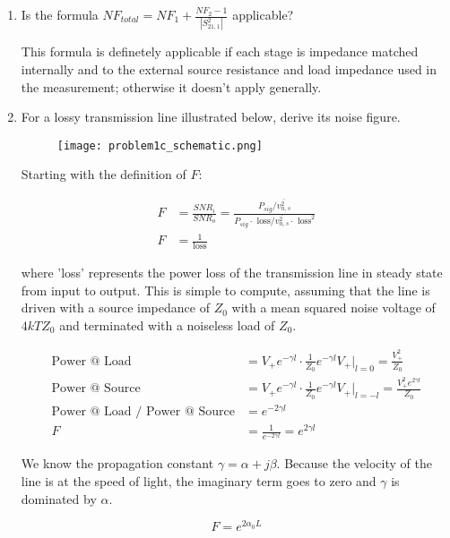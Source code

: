\begin{enumerate}[label=(\alph*)]
    \item {\color{blue} Is the formula $NF_{total} = NF_1 + \frac{NF_2-1}{|S_{21,1}^2|}$ applicable?}

    This formula is definetely applicable if each stage is impedance matched internally and to the external source resistance and load impedance used in the measurement; otherwise it doesn't apply generally.

    \item {\color{blue} For a lossy transmission line illustrated below, derive its noise figure.}

    \begin{figure}[H]
        \centering \texttt{[image: problem1c\_schematic.png]}
    \end{figure}

    Starting with the definition of $F$:

    \begin{align*}
        F &= \frac{SNR_i}{SNR_o} = \frac{P_{sig}/\overline{v_{n,s}^2}}{P_{sig} \cdot \text{ loss} / \overline{v_{n,s}^2} \cdot \text{ loss}^2} \\
        F &= \frac{1}{\text{loss}}
    \end{align*}

    where 'loss' represents the power loss of the transmission line in steady state from input to output. This is simple to compute, assuming that the line is driven with a source impedance of $Z_0$ with a mean squared noise voltage of $4 kT Z_0$ and terminated with a noiseless load of $Z_0$.

    \begin{align*}
        \text{Power @ Load} &= V_+ e^{-\gamma l} \cdot \frac{1}{Z_0} e^{-\gamma l} V_+ \rvert_{l=0} = \frac{V_+^2}{Z_0} \\
        \text{Power @ Source} &= V_+ e^{-\gamma l} \cdot \frac{1}{Z_0} e^{-\gamma l} V_+ \rvert_{l=-l} = \frac{V_+^2 e^{2 \gamma l}}{Z_0} \\
        \text{Power @ Load / Power @ Source} &= e^{-2 \gamma l} \\
        F &= \frac{1}{e^{-2 \gamma l}} = e^{2 \gamma l}
    \end{align*}

    We know the propagation constant $\gamma = \alpha + j \beta$. Because the velocity of the line is at the speed of light, the imaginary term goes to zero and $\gamma$ is dominated by $\alpha$.

    $$ F = e^{2 \alpha_0 L} $$


\end{enumerate}
